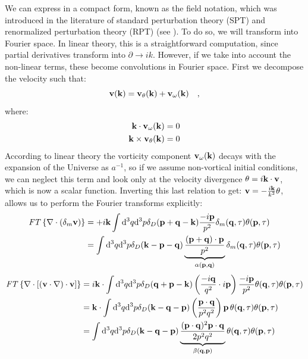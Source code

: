 We can express  in a compact
form, known as the field notation, which was introduced in the literature of
standard perturbation theory (SPT) and renormalized
perturbation theory (RPT) (see \cite{bernardeau_large-scale_2001,crocce_renormalized_2005,pietroni_flowing_2008}). 
To do so, we will transform  into Fourier space.
In linear theory, this is a straightforward computation,
since partial derivatives transform into $\partial \rightarrow ik$.
However, if we take into account the non-linear terms, these become convolutions
in Fourier space.
First we decompose the velocity such that:
\begin{equation}
\mathbf{v}(\mathbf{k})=\mathbf{v}_{\theta}(\mathbf{k})+\mathbf{v{}_{\omega}}(\mathbf{k}) \quad,
\end{equation}
where:
\begin{align*}
\mathbf{k}\cdot\mathbf{v_{\omega}}(\mathbf{k}) & =0\\
\mathbf{k}\times\mathbf{v_{\theta}}(\mathbf{k}) & =0
\end{align*}
According to linear theory the vorticity component $\mathbf{v{}_{\omega}}(\mathbf{k})$
decays with the expansion of the Universe as $a^{-1}$, so if we assume
non-vortical initial conditions, we can neglect this term and look
only at the velocity divergence $\theta=i\mathbf{k}\cdot\mathbf{v}$, which
is now a scalar function. Inverting this last relation to get: $\mathbf{v}=-\frac{i\mathbf{k}}{k^{2}}\theta$,
allows us to perform the Fourier transforms explicitly:
\begin{align*}
\mathit{FT}\left\{ \nabla\cdot(\delta_{m}\mathbf{v})\right\}  & =+i\mathbf{k}\int\mathrm{d}^{3}q\mathrm{d}^{3}p\delta_{D}(\mathbf{p}+\mathbf{q}-\mathbf{k})\frac{-i\mathbf{p}}{p^{2}}\delta_{m}(\mathbf{q},\tau)\theta(\mathbf{p},\tau)\\
& =\int\mathrm{d}^{3}q\mathrm{d}^{3}p\delta_{D}(\mathbf{k}-\mathbf{p}-\mathbf{q})\underbrace{\frac{\left(\mathbf{p}+\mathbf{q}\right)\cdot\mathbf{p}}{p^{2}}}_{\alpha(\mathbf{p},\mathbf{q})}\delta_{m}(\mathbf{q},\tau)\theta(\mathbf{p},\tau)
\end{align*}
\begin{align*}
\mathit{FT}\left\{ \nabla\cdot\left[\left(\mathbf{v}\cdot\nabla\right)\cdot\mathbf{v}\right]\right\}  & =i\mathbf{k}\cdot\int\mathrm{d}^{3}q\mathrm{d}^{3}p\delta_{D}(\mathbf{q}+\mathbf{p}-\mathbf{k})\left(\frac{-i\mathbf{q}}{q^{2}}\cdot i\mathbf{p}\right)\frac{-i\mathbf{p}}{p^{2}}\theta(\mathbf{q},\tau)\theta(\mathbf{p},\tau)\\
& =\mathbf{k}\cdot\int\mathrm{d}^{3}q\mathrm{d}^{3}p\delta_{D}(\mathbf{k}-\mathbf{q}-\mathbf{p})\left(\frac{\mathbf{p}\cdot\mathbf{q}}{p^{2}q^{2}}\right)\mathbf{p}\,\theta(\mathbf{q},\tau)\theta(\mathbf{p},\tau)\\
& =\int\mathrm{d}^{3}q\mathrm{d}^{3}p\delta_{D}(\mathbf{k}-\mathbf{q}-\mathbf{p})\underbrace{\frac{(\mathbf{p}\cdot\mathbf{q})^{2}\mathbf{p}\cdot\mathbf{q}}{2p^{2}q^{2}}}_{\beta(\mathbf{q},\mathbf{p})}\theta(\mathbf{q},\tau)\theta(\mathbf{p},\tau)
\end{align*}
